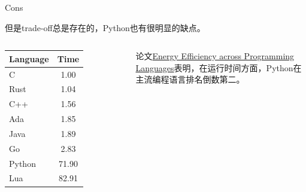 \documentclass[aspectratio=169, 14pt]{beamer}
\begin{document}
\begin{frame}
	\begin{exampleblock}{Cons}

		但是\alert{trade-off}总是存在的，Python也有很明显的缺点。
	\end{exampleblock}

	\begin{columns}
		\begin{tabular}{l c}
			\hline
			\textbf{Language} & \textbf{Time} \\
			\hline
			C                 & 1.00          \\
			Rust              & 1.04          \\
			C++               & 1.56          \\
			Ada               & 1.85          \\
			Java              & 1.89          \\
			Go                & 2.83          \\
			Python            & 71.90         \\
			Lua               & 82.91         \\
			\hline
		\end{tabular}
		论文\href{https://greenlab.di.uminho.pt/wp-content/uploads/2017/09/paperSLE.pdf}{Energy Efficiency across Programming Languages}表明，在运行时间方面，Python在主流编程语言排名\alert{倒数第二}。
	\end{columns}
\end{frame}
\end{document}
